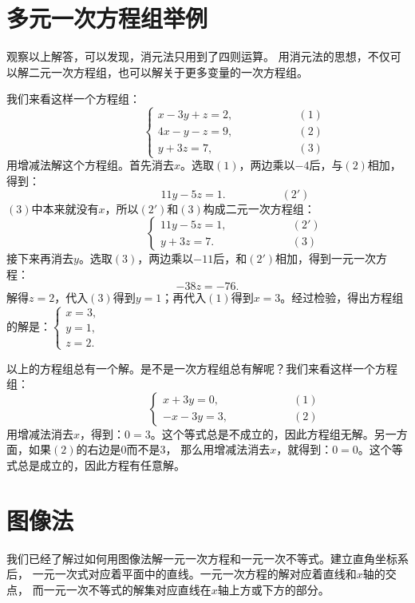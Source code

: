 \documentclass[12pt,UTF8]{ctexbook}
\begin{document}
\section{多元一次方程组举例}
观察以上解答，可以发现，消元法只用到了四则运算。
用消元法的思想，不仅可以解二元一次方程组，也可以解关于更多变量的一次方程组。

我们来看这样一个方程组：
$$ \quad \quad \quad \quad \quad\left\{
\begin{array}{cr}
     x - 3y + z = 2, & \quad \quad \quad \quad \quad (1) \\
     4x - y - z = 9, & \quad \quad \quad \quad \quad (2) \\
     y + 3z = 7, & \quad \quad \quad \quad \quad (3)
\end{array}\right.
$$
用增减法解这个方程组。首先消去$x$。选取$(1)$，两边乘以$-4$后，与$(2)$相加，得到：
$$ \quad\quad\quad\quad\quad 11y -5z = 1.\quad\quad\quad\quad\quad (2')$$
$(3)$中本来就没有$x$，所以$(2')$和$(3)$构成二元一次方程组：
$$ \quad \quad \quad \quad \quad\left\{
\begin{array}{cr}
    11y -5z = 1, & \quad \quad \quad \quad \quad (2') \\
    y + 3z = 7. & \quad \quad \quad \quad \quad (3) 
\end{array}\right.
$$
接下来再消去$y$。选取$(3)$，两边乘以$-11$后，和$(2')$相加，得到一元一次方程：
$$ -38z = -76.$$
解得$z = 2$，代入$(3)$得到$y = 1$；再代入$(1)$得到$x = 3$。经过检验，得出方程组的解是：$\left\{ \begin{array}{c}
    x = 3, \\
    y = 1, \\
    z = 2.
\end{array}\right.$

以上的方程组总有一个解。是不是一次方程组总有解呢？我们来看这样一个方程组：
$$ \quad \quad \quad \quad \quad\left\{
\begin{array}{cr}
     x + 3y = 0, & \quad \quad \quad \quad \quad (1) \\
     -x - 3y = 3, & \quad \quad \quad \quad \quad (2)
\end{array}\right.
$$
用增减法消去$x$，得到：$0 = 3$。这个等式总是不成立的，因此方程组无解。另一方面，如果$(2)$的右边是$0$而不是$3$，
那么用增减法消去$x$，就得到：$0 = 0$。这个等式总是成立的，因此方程有任意解。

\section{图像法}
我们已经了解过如何用图像法解一元一次方程和一元一次不等式。建立直角坐标系后，
一元一次式对应着平面中的直线。一元一次方程的解对应着直线和$x$轴的交点，
而一元一次不等式的解集对应直线在$x$轴上方或下方的部分。
\end{document}
